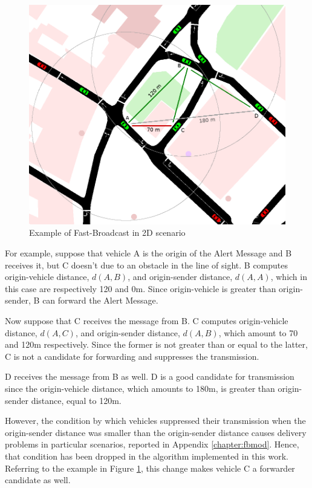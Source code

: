 		\begin{figure}[H]
			\centering
			\includegraphics[width=\textwidth]{immagini/fb-2dpicc}
			\caption{Example of Fast-Broadcast in 2D scenario}
			\label{fig:fb-2d}
		\end{figure}
		
		
		
		For example, suppose that vehicle A is the origin of the Alert Message and B receives it, but C doesn't due to an obstacle in the line of sight. B computes origin-vehicle distance, $d(A, B)$, and origin-sender distance, $d(A, A)$, which in this case are respectively 120 and 0m. Since origin-vehicle is greater than origin-sender, B can forward the Alert Message.
		
		
		Now suppose that C receives the message from B. C computes origin-vehicle distance, $d(A, C)$, and origin-sender distance, $d(A, B)$, which amount to 70 and 120m respectively. Since the former is not greater than or equal to the latter, C is not a candidate for forwarding and suppresses the transmission.
		
		
		D receives the message from B as well. D is a good candidate for transmission since the origin-vehicle distance, which amounts to 180m, is greater than origin-sender distance, equal to 120m.
		
		However, the condition by which vehicles suppressed their transmission when the origin-sender distance was smaller than the origin-sender distance causes delivery problems in particular scenarios, reported in Appendix \ref{chapter:fbmod}. Hence, that condition has been dropped in the algorithm implemented in this work. Referring to the example in Figure \ref{fig:fb-2d}, this change makes vehicle C a forwarder candidate as well.
		
